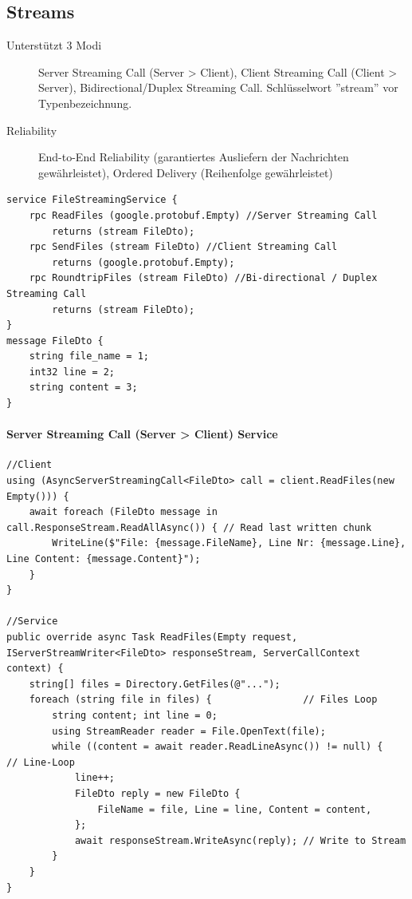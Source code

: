 \documentclass[
a4paper,
oneside,
10pt,
fleqn,
headsepline,
toc=listofnumbered, 
bibliography=totocnumbered]{scrartcl}
\begin{document}
\subsection{Streams}
\begin{description}
	\item[Unterstützt 3 Modi] Server Streaming Call (Server > Client), Client Streaming Call (Client > Server), Bidirectional/Duplex Streaming Call. Schlüsselwort ''stream'' vor Typenbezeichnung.
	\item[Reliability] End-to-End Reliability (garantiertes Ausliefern der Nachrichten gewährleistet), Ordered Delivery (Reihenfolge gewährleistet)
\end{description}
\begin{lstlisting}
service FileStreamingService {
    rpc ReadFiles (google.protobuf.Empty) //Server Streaming Call
        returns (stream FileDto);
    rpc SendFiles (stream FileDto) //Client Streaming Call
        returns (google.protobuf.Empty);
    rpc RoundtripFiles (stream FileDto) //Bi-directional / Duplex Streaming Call
        returns (stream FileDto);
}
message FileDto {
    string file_name = 1;
    int32 line = 2;
    string content = 3;
}
\end{lstlisting}

\paragraph{Server Streaming Call (Server > Client) Service}
\begin{lstlisting}
//Client
using (AsyncServerStreamingCall<FileDto> call = client.ReadFiles(new Empty())) {
    await foreach (FileDto message in call.ResponseStream.ReadAllAsync()) { // Read last written chunk
        WriteLine($"File: {message.FileName}, Line Nr: {message.Line}, Line Content: {message.Content}");
    }
}

//Service
public override async Task ReadFiles(Empty request, IServerStreamWriter<FileDto> responseStream, ServerCallContext context) {
    string[] files = Directory.GetFiles(@"...");
    foreach (string file in files) {                // Files Loop
        string content; int line = 0;
        using StreamReader reader = File.OpenText(file);
        while ((content = await reader.ReadLineAsync()) != null) {      // Line-Loop
            line++;
            FileDto reply = new FileDto {
                FileName = file, Line = line, Content = content,
            };
            await responseStream.WriteAsync(reply); // Write to Stream
        }
    }
}
\end{lstlisting}
\end{document}
